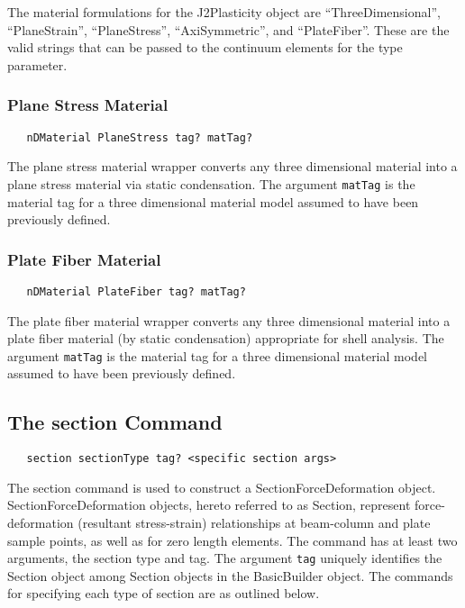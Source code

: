 \documentclass[12pt]{article}
\begin{document}
The material formulations for the J2Plasticity object are
``ThreeDimensional'', ``PlaneStrain'', ``PlaneStress'', ``AxiSymmetric'',
and ``PlateFiber''. These are the valid strings that can be passed to the
continuum elements for the type parameter. 


\subsubsection{Plane Stress Material}
{\sf\small
\begin{verbatim}
   nDMaterial PlaneStress tag? matTag? 
\end{verbatim}
}
The plane stress material wrapper converts any three dimensional 
material into a plane stress material via static condensation.
The argument {\tt matTag} is the material tag for a three 
dimensional material model assumed to have been previously defined.


\subsubsection{Plate Fiber Material}
{\sf\small
\begin{verbatim}
   nDMaterial PlateFiber tag? matTag? 
\end{verbatim}
}
The plate fiber material wrapper converts any three dimensional 
material into a plate fiber material (by static condensation) appropriate
for shell analysis.
The argument {\tt matTag} is the material tag for a three 
dimensional material model  assumed to have been previously defined.


\subsection{The section Command}
{\sf\small
\begin{verbatim}
   section sectionType tag? <specific section args>
\end{verbatim}
}

The section command is used to construct a SectionForceDeformation object.
SectionForceDeformation objects, hereto referred to as Section, represent force-deformation (resultant stress-strain) relationships at beam-column and
plate sample points, as well as for zero length elements. The
command has at least two arguments, the section type and tag.
The argument {\tt tag}
uniquely identifies the 
Section object among Section objects in the BasicBuilder object.
The
commands for specifying each type of section are as outlined below.
\end{document}
